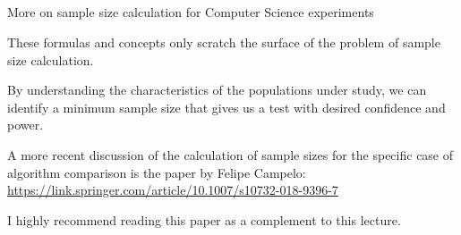 \subsection{}
\begin{frame}{More on sample size calculation for Computer Science experiments}

  These formulas and concepts only scratch the surface of the problem of sample size calculation. \bigskip

  By understanding the characteristics of the populations under study, we can identify a minimum sample size that gives us a test with desired confidence and power.\bigskip

  A more recent discussion of the calculation of sample sizes for the specific case of algorithm comparison is the paper by Felipe Campelo:\\
  \url{https://link.springer.com/article/10.1007/s10732-018-9396-7}\bigskip

  I highly recommend reading this paper as a complement to this lecture.
\end{frame}
